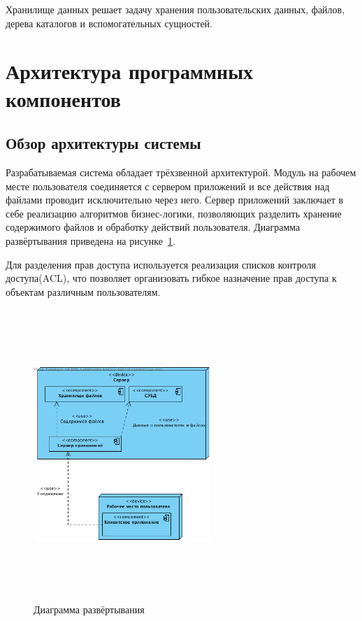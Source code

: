 \documentclass[utf8,usehyperref,12pt]{G7-32}
\begin{document}
Хранилище данных решает задачу хранения пользовательских данных, файлов, дерева каталогов и вспомогательных сущностей.


\section{Архитектура программных компонентов}
\subsection{Обзор архитектуры системы}

Разрабатываемая система обладает трёхзвенной архитектурой. Модуль на рабочем месте пользователя соединяется с сервером приложений и все действия над файлами проводит исключительно через него. Сервер приложений заключает в себе реализацию алгоритмов бизнес-логики, позволяющих разделить хранение содержимого файлов и обработку действий пользователя. Диаграмма развёртывания приведена на рисунке~\ref{fig:deploy}. 

Для разделения прав доступа используется реализация списков контроля доступа(ACL)\cite{wiki_acl}, что позволяет организовать гибкое назначение прав доступа к объектам различным пользователям. 

\begin{figure}[ht]
   \centering%
   \includegraphics[height=110mm, width=0.6\textwidth, clip, keepaspectratio]{pictures/Deploy}
   \caption{Диаграмма развёртывания}\label{fig:deploy}
 \end{figure}
\end{document}
